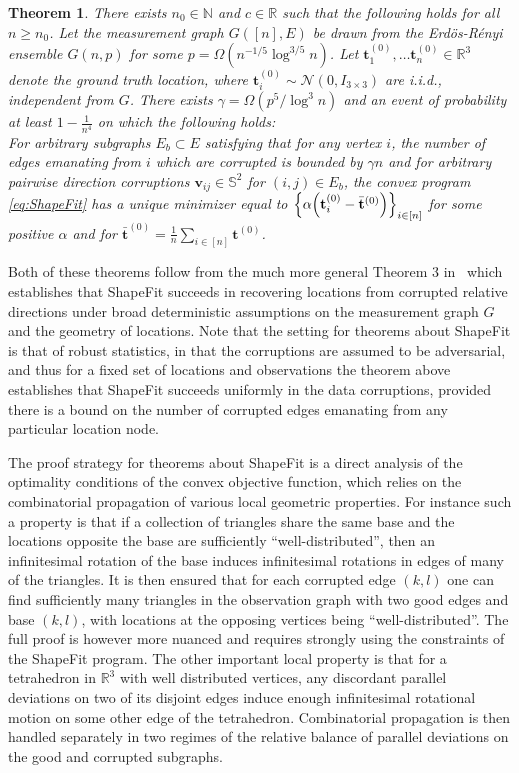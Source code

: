 \documentclass[10pt]{article}
\newcommand{\R}{\ensuremath{\mathbb{R}}}
\newtheorem{thm}{Theorem}
\begin{document}
\begin{thm} 
\label{thm:ShapeFit3D} 
There exists $n_0 \in \mathbb{N}$ and $c \in \R$ such that the following holds for all $n \ge n_0$. Let the measurement graph $G([n],E)$ be drawn from the Erd\"{o}s-R\'{e}nyi ensemble $G(n,p)$ for some $p = \Omega( n^{-1/5} \log^{3/5} n)$. Let $\mathbf{t}^{(0)}_1, \ldots \mathbf{t}^{(0)}_n  \in \R^3$ denote the ground truth location, where $\mathbf{t}^{(0)}_i \sim \mathcal{N}(0, I_{3 \times 3})$ are i.i.d., independent from $G$. There exists $\gamma = \Omega(p^5 / \log^3 n)$ and an event of probability at least  $1- \frac{1}{n^{4}}$ on which the following holds:\\[1em]
For arbitrary subgraphs $E_b \subset E$ satisfying that for any vertex $i$, the number of edges emanating from $i$ which are corrupted is bounded by $\gamma n$ and for arbitrary pairwise direction corruptions $\mathbf{v}_{ij} \in \mathbb{S}^2$ for $(i,j) \in E_b$,  the convex program \eqref{eq:ShapeFit} has a unique minimizer equal to $\left \{\alpha \Bigl(\mathbf{t}^{(0)}_i - \bar{\mathbf{t}}^{(0)} \Bigr)\right\}_{i \in [n]}$ for some positive $\alpha$ and for $\bar{\mathbf{t}}^{(0)} = \frac{1}{n}\sum_{i\in [n]} \mathbf{t}^{(0)}$. 
\end{thm}
Both of these theorems follow from the much more general Theorem 3 in~\cite{ShapeFit} which establishes that ShapeFit succeeds in recovering locations from corrupted relative directions under broad deterministic assumptions on the measurement graph $G$ and the geometry of locations. Note that the setting for theorems about ShapeFit is that of robust statistics, in that the corruptions are assumed to be adversarial, and thus for a fixed set of locations and observations the theorem above establishes that ShapeFit succeeds uniformly in the data corruptions, provided there is a bound on the number of corrupted edges emanating from any particular location node.

The proof strategy for theorems about ShapeFit is a direct analysis of the optimality conditions of the convex objective function, which relies on the combinatorial propagation of various local geometric properties. For instance such a property is that if a collection of triangles share the same base and the locations opposite the base are sufficiently ``well-distributed'', then an infinitesimal rotation of the base induces infinitesimal rotations in edges of many of the triangles. It is then ensured that for each corrupted edge $(k,l)$ one can find sufficiently many triangles in the observation graph with two good edges and base $(k, l)$, with locations at the opposing vertices being ``well-distributed''. The full proof is however more nuanced and requires strongly using the constraints of the ShapeFit program. The other important local property is that for a tetrahedron in $\R^3$ with well distributed vertices, any discordant parallel deviations on two of its disjoint edges induce enough infinitesimal rotational motion on some other edge of the tetrahedron. Combinatorial propagation is then handled separately in two regimes of the relative balance of parallel deviations on the good and corrupted subgraphs.
\end{document}
